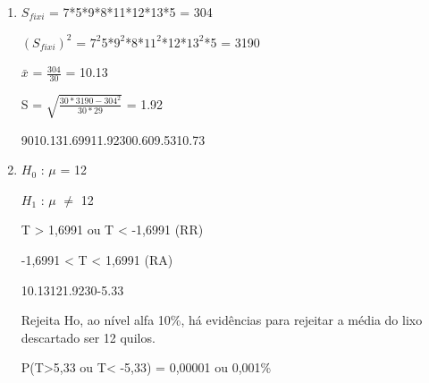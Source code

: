 \begin{question}
    
    \begin{enumerate}[label={\textbf{\alph*)}}]

        \item
   
            $S_{fixi}$ = 7*5*9*8*11*12*13*5 = 304

            $(S_{fixi})^2$ = $7^2$5*$9^2$*8*$11^2$*12*$13^2$*5 = 3190

            $\bar{x}$ = $\frac{304}{30}$ = 10.13 

            S = $\sqrt{\frac{30*3190-304^2}{30*29}}$ = 1.92

            \begin{formula2}
                {90}{10.13}{1.6991}{1.92}{30}{0.60}{9.53}{10.73}
            \end{formula2}

        \item 

            $H_0$ : $\mu$ = 12

            $H_1$ : $\mu$ $\neq$ 12 
        
            T > 1,6991 ou T < -1,6991 (RR)

            -1,6991 < T < 1,6991 (RA)

            \begin{formula7}
                {10.13}{12}{1.92}{30}{-5.33}
            \end{formula7}

            Rejeita Ho, ao nível alfa 10\%, há evidências para rejeitar
            a média do lixo descartado ser 12 quilos. 

            P(T>5,33 ou T< -5,33) = 0,00001 ou 0,001\%

    \end{enumerate}
\end{question}